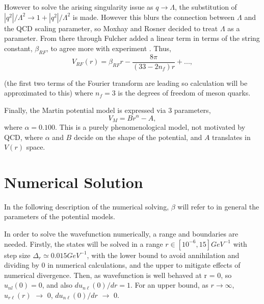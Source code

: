 \documentclass[10pt,twocolumn]{revtex4}    %
\begin{document}
However to solve the arising singularity issue as $q\rightarrow \Lambda$, the substitution of $|q^2|/\Lambda^2 \rightarrow 1+|q^2|/\Lambda^2$ is made. However this blurs the connection between $\Lambda$ and the QCD scaling parameter, so Moxhay and Rosner decided to treat $\Lambda$ as a parameter. From there through Fulcher added a linear term in terms of the string constant, $\beta_{RF}$, to agree more with experiment \textbf{\cite{RichardsonPaper}}. Thus,
\begin{equation}\label{eqn:RichV}
    V_{RF}(r) = \beta_{RF}r - \frac{8\pi}{(33-2n_f)r} + ... ,
\end{equation}

(the first two terms of the Fourier transform are leading so calculation will be approximated to this) where $n_f = 3$ is the degrees of freedom of meson quarks.

Finally, the Martin potential model \textbf{\cite{MartinPaper}} is expressed via 3 parameters,
\begin{equation}\label{eqn:MartinV}
    V_{M} = Br^\alpha - A,
\end{equation}
where $\alpha = 0.100$\textbf{\cite{MartinPaper}}. This is a purely phenomenological model, not motivated by QCD, where $\alpha$ and $B$ decide on the shape of the potential, and $A$ translates in $V(r)$ space.


\section{Numerical Solution} \label{sec:numericalSolution}


In the following description of the numerical solving, $\beta$ will refer to in general the parameters of the potential models.


In order to solve the wavefunction numerically, a range and boundaries are needed. Firstly, the states will be solved in a range $r \in [10^{-6}, 15]GeV^{-1}$ with step size $\Delta_r \simeq 0.015GeV^{-1}$, with the lower bound to avoid annihilation and dividing by $0$ in numerical calculations, and the upper to mitigate effects of numerical divergence. Then, as wavefunction is well behaved at r = 0, so $u_{nl}(0) = 0$, and also $du_{n \ell}(0)/dr = 1$. For an upper bound, as $r \rightarrow \infty$, $u_{r \ell}(r)$ $\rightarrow$ 0, $du_{n \ell}(0)/dr$ $\rightarrow$ 0. 
\end{document}

